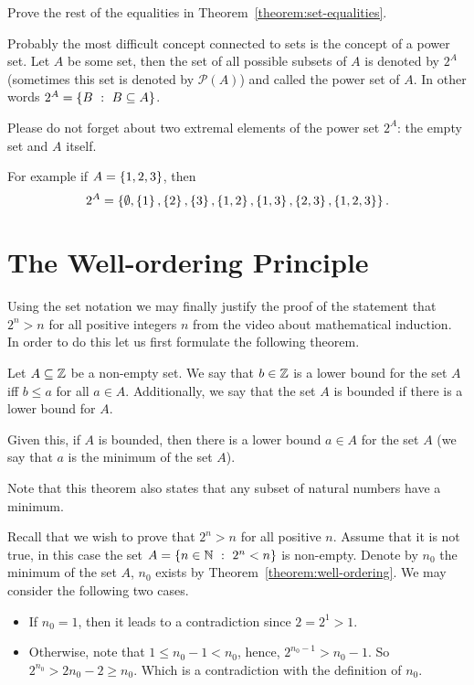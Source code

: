 \begin{exercise}
\label{exercise:set-equalities}
  Prove the rest of the equalities in Theorem~\ref{theorem:set-equalities}.
\end{exercise}

Probably the most difficult concept connected to sets is
the concept of a power set. Let $A$ be some set, then the set of
all possible subsets of $A$ is denoted by $2^A$ (sometimes this set is denoted
by $\mathcal{P}(A)$) and called the power set of $A$. In other words $2^A =
\set[B \subseteq A]{B}$.


\begin{warning}
  Please do not forget about two extremal elements of the power set $2^A$: the
  empty set and $A$ itself.
\end{warning}

\noindent For example if $A = \set{1, 2, 3}$, then $$2^A = \set{\emptyset,
\set{1}, \set{2}, \set{3}, \set{1, 2}, \set{1, 3}, \set{2, 3}, \set{1, 2, 3}}.$$

\section{The Well-ordering Principle}
Using the set notation we may finally justify the proof of the statement
that $2^n > n$ for all positive integers $n$ from the video about mathematical
induction. In order to do this let us first formulate the following theorem.
\begin{theorem}
\label{theorem:well-ordering}
  Let $A \subseteq \mathbb{Z}$ be a non-empty set. We say that $b \in \mathbb{Z}$ is a lower
  bound for the set $A$ iff $b \le a$ for all $a \in A$. Additionally, we say
  that the set $A$ is bounded if there is a lower bound for $A$.

  Given this, if $A$ is bounded, then there is a lower bound $a \in A$ for the set $A$
  (we say that $a$ is the minimum of the set $A$).
\end{theorem}
Note that this theorem also states that any subset of natural numbers have a
minimum.

Recall that we wish to prove that $2^n > n$ for all positive $n$.
Assume that it is not true, in this case the set
$A = \set[2^n < n]{n \in \N}$ is non-empty. Denote by $n_0$ the minimum of the
set $A$, $n_0$ exists by Theorem~\ref{theorem:well-ordering}. We may consider
the following two cases.
\begin{itemize}
  \item If $n_0 = 1$, then it leads to a contradiction since $2 = 2^1 > 1$.
  \item Otherwise, note that $1 \le n_0 - 1 < n_0$, hence,
    $2^{n_0 - 1} > n_0 - 1$. So $2^{n_0} > 2n_0 - 2 \ge n_0$. Which is a
    contradiction with the definition of $n_0$.
\end{itemize}

